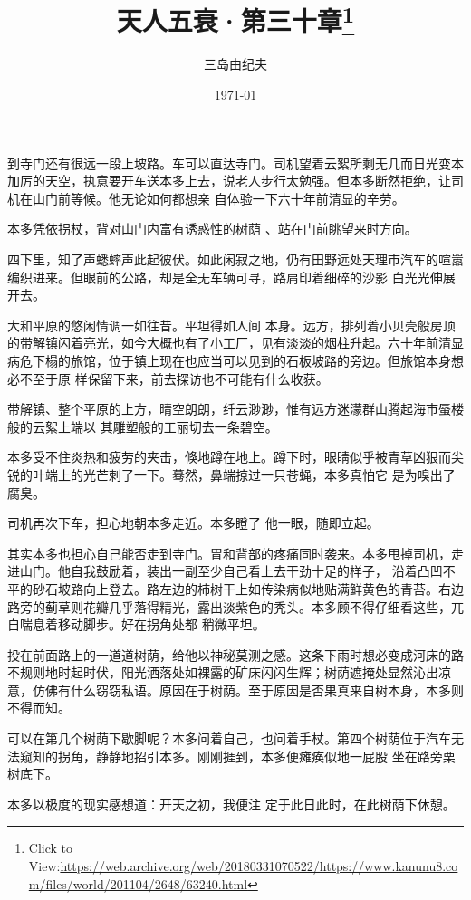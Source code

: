 \documentclass{article}
\title{天人五衰·第三十章\footnote{Click to View:\url{https://web.archive.org/web/20180331070522/https://www.kanunu8.com/files/world/201104/2648/63240.html}}}
\author{三岛由纪夫}
\date{1971-01}
\begin{document}

\maketitle


\Large

﻿到寺门还有很远一段上坡路。车可以直达寺门。司机望着云絮所剩无几而日光变本加厉的天空，执意要开车送本多上去，说老人步行太勉强。但本多断然拒绝，让司机在山门前等候。他无论如何都想亲
自体验一下六十年前清显的辛劳。 

本多凭依拐杖，背对山门内富有诱惑性的树荫
、站在门前眺望来时方向。 

四下里，知了声蟋蟀声此起彼伏。如此闲寂之地，仍有田野远处天理市汽车的喧嚣编织进来。但眼前的公路，却是全无车辆可寻，路肩印着细碎的沙影
白光光伸展开去。 

大和平原的悠闲情调一如往昔。平坦得如人间
\newpage
本身。远方，排列着小贝壳般房顶的带解镇闪着亮光，如今大概也有了小工厂，见有淡淡的烟柱升起。六十年前清显病危下榻的旅馆，位于镇上现在也应当可以见到的石板坡路的旁边。但旅馆本身想必不至于原
样保留下来，前去探访也不可能有什么收获。 

带解镇、整个平原的上方，晴空朗朗，纤云渺渺，惟有远方迷濛群山腾起海市蜃楼般的云絮上端以
其雕塑般的工丽切去一条碧空。 

本多受不住炎热和疲劳的夹击，倏地蹲在地上。蹲下时，眼睛似乎被青草凶狠而尖锐的叶端上的光芒刺了一下。蓦然，鼻端掠过一只苍蝇，本多真怕它
是为嗅出了腐臭。 

司机再次下车，担心地朝本多走近。本多瞪了
他一眼，随即立起。 

其实本多也担心自己能否走到寺门。胃和背部的疼痛同时袭来。本多甩掉司机，走进山门。他自我鼓励着，装出一副至少自己看上去干劲十足的样子，
\newpage
沿着凸凹不平的砂石坡路向上登去。路左边的柿树干上如传染病似地贴满鲜黄色的青苔。右边路旁的蓟草则花瓣几乎落得精光，露出淡紫色的秃头。本多顾不得仔细看这些，兀自喘息着移动脚步。好在拐角处都
稍微平坦。 

投在前面路上的一道道树荫，给他以神秘莫测之感。这条下雨时想必变成河床的路不规则地时起时伏，阳光洒落处如裸露的矿床闪闪生辉；树荫遮掩处显然沁出凉意，仿佛有什么窃窃私语。原因在于树荫。至于原因是否果真来自树本身，本多则不得而知。
 

可以在第几个树荫下歇脚呢？本多问着自己，也问着手杖。第四个树荫位于汽车无法窥知的拐角，静静地招引本多。刚刚捱到，本多便瘫痪似地一屁股
坐在路旁栗树底下。 

本多以极度的现实感想道：开天之初，我便注
定于此日此时，在此树荫下休憩。 

\newpage
\end{document}

